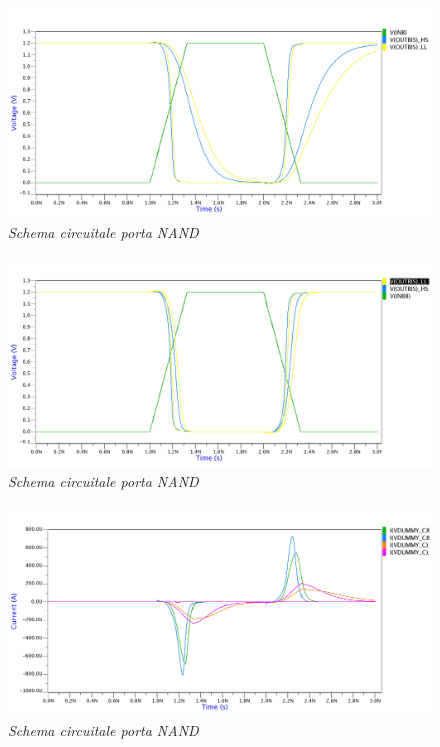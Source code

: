 \begin{figure}[!htb]
	\centering
	\includegraphics[scale=0.1]{immagini/onde_5_4_voltage1}
	\caption{\textit{Schema circuitale porta NAND}}
	\label{onde_5_4_voltage1}
\end{figure}
\begin{figure}[!htb]
	\centering
	\includegraphics[scale=0.1]{immagini/onde_5_4_voltage2}
	\caption{\textit{Schema circuitale porta NAND}}
	\label{onde_5_4_voltage2}
\end{figure}
\newpage
\begin{figure}[!htb]
	\centering
	\includegraphics[scale=0.12]{immagini/onde_5_4_current1}
	\caption{\textit{Schema circuitale porta NAND}}
	\label{onde_5_4_current1}
\end{figure}
